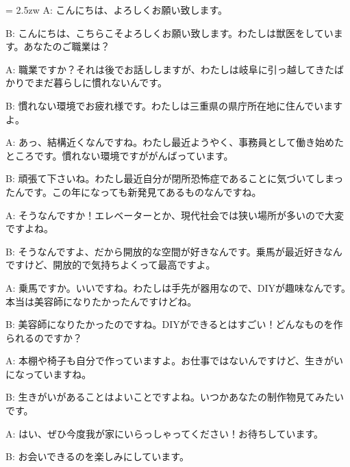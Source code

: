 \documentclass[11pt]{amsart}
\title{}
\author{}
\newenvironment{hangall}[1]{\hangindent = 2.5zw\everypar{\hangindent = 2.5zw}}{}
\begin{document}
\maketitle
\begin{hangall}{}%
A: こんにちは、よろしくお願い致します。

B: こんにちは、こちらこそよろしくお願い致します。わたしは獣医をしています。あなたのご職業は？

A: 職業ですか？それは後でお話ししますが、わたしは岐阜に引っ越してきたばかりでまだ暮らしに慣れないんです。

B: 慣れない環境でお疲れ様です。わたしは三重県の県庁所在地に住んでいますよ。

A: あっ、結構近くなんですね。わたし最近ようやく、事務員として働き始めたところです。慣れない環境ですががんばっています。

B: 頑張て下さいね。わたし最近自分が閉所恐怖症であることに気づいてしまったんです。この年になっても新発見てあるものなんですね。

A: そうなんですか！エレベーターとか、現代社会では狭い場所が多いので大変ですよね。

B: そうなんですよ、だから開放的な空間が好きなんです。乗馬が最近好きなんですけど、開放的で気持ちよくって最高ですよ。

A: 乗馬ですか。いいですね。わたしは手先が器用なので、DIYが趣味なんです。本当は美容師になりたかったんですけどね。

B: 美容師になりたかったのですね。DIYができるとはすごい！どんなものを作られるのですか？

A: 本棚や椅子も自分で作っていますよ。お仕事ではないんですけど、生きがいになっていますね。

B: 生きがいがあることはよいことですよね。いつかあなたの制作物見てみたいです。

A: はい、ぜひ今度我が家にいらっしゃってください！お待ちしています。

B: お会いできるのを楽しみにしています。
\end{hangall}
\end{document}
